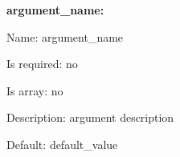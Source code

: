 {\bfseries argument\+\_\+name\+:}


\begin{DoxyItemize}
\item Name\+: argument\+\_\+name
\item Is required\+: no
\item Is array\+: no
\item Description\+: argument description
\item Default\+: {\ttfamily \textquotesingle{}default\+\_\+value\textquotesingle{}} 
\end{DoxyItemize}